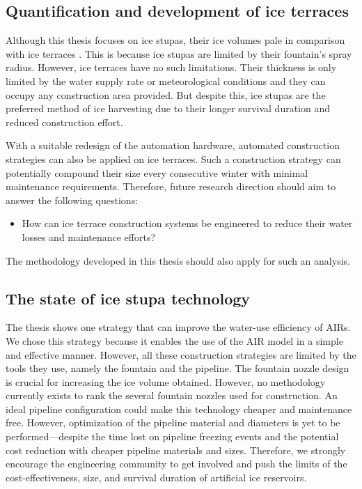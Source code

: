 
\subsection{Quantification and development of ice terraces}

Although this thesis focuses on ice stupas, their ice volumes pale in comparison with ice terraces
\citep{nusserSociohydrologyArtificialGlaciers2019}. This is because ice stupas are limited by their fountain's
spray radius. However, ice terraces have no such limitations. Their thickness is only limited by the water
supply rate or meteorological conditions and they can occupy any construction area provided. But despite this, ice
stupas are the preferred method of ice harvesting due to their longer survival duration and reduced construction
effort.

With a suitable redesign of the automation hardware, automated construction strategies can also be applied on
ice terraces. Such a construction strategy can potentially compound their size every consecutive winter with
minimal maintenance requirements. Therefore, future research direction should aim to answer the following
questions:

\begin{itemize}

	\item How can ice terrace construction systems be engineered to reduce their water losses and maintenance
	      efforts?

\end{itemize}

The methodology developed in this thesis should also apply for such an analysis.

\subsection{The state of ice stupa technology}

The thesis shows one strategy that can improve the water-use efficiency of AIRs. We chose this strategy because
it enables the use of the AIR model in a simple and effective manner. However, all these construction strategies
are limited by the tools they use, namely the fountain and the pipeline. The fountain nozzle design is crucial
for increasing the ice volume obtained. However, no methodology currently exists to rank the several fountain
nozzles used for construction. An ideal pipeline configuration could make this technology cheaper and
maintenance free. However, optimization of the pipeline material and diameters is yet to be performed---despite
the time lost on pipeline freezing events and the potential cost reduction with cheaper pipeline materials and
sizes. Therefore, we strongly encourage the engineering community to get involved and push the limits of the
cost-effectiveness, size, and survival duration of artificial ice reservoirs.

